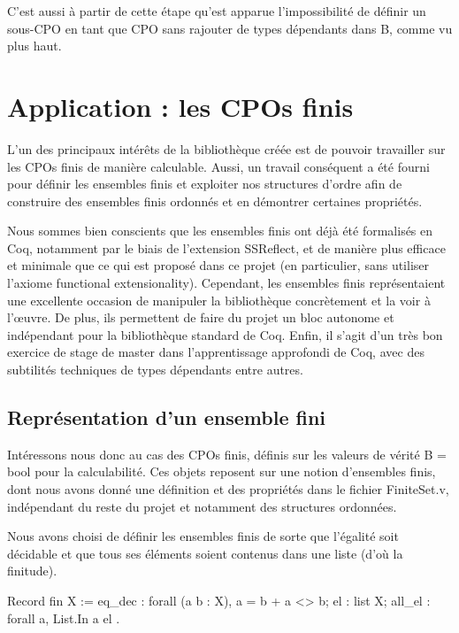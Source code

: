 \documentclass{article}
\newcommand\code[1]{{\fontfamily{lmtt}\selectfont #1}}
\theoremstyle{definition}
\begin{document}
C'est aussi à partir de cette étape qu'est apparue l'impossibilité de définir un sous-CPO en tant que CPO sans rajouter de types dépendants dans \code{B}, comme vu plus haut.



\section{Application :  les CPOs finis}

L'un des principaux intérêts de la bibliothèque créée est de pouvoir travailler sur les CPOs finis de manière calculable. Aussi, un travail conséquent a été fourni pour définir les ensembles finis et exploiter nos structures d'ordre afin de construire des ensembles finis ordonnés et en démontrer certaines propriétés.

Nous sommes bien conscients que les ensembles finis ont déjà été formalisés en Coq, notamment par le biais de l'extension SSReflect, et de manière plus efficace et minimale que ce qui est proposé dans ce projet (en particulier, sans utiliser l'axiome \code{functional extensionality}). Cependant, les ensembles finis représentaient une excellente occasion de manipuler la bibliothèque concrètement et la voir à l’œuvre. De plus, ils permettent de faire du projet un bloc autonome et indépendant pour la bibliothèque standard de Coq. Enfin, il s'agit d'un très bon exercice de stage de master dans l'apprentissage approfondi de Coq, avec des subtilités techniques de types dépendants entre autres.


\subsection{Représentation d'un ensemble fini}
\label{finis}

Intéressons nous donc au cas des CPOs finis, définis sur les valeurs de vérité \code{B = bool} pour la calculabilité. Ces objets reposent sur une notion d'ensembles finis, dont nous avons donné une définition et des propriétés dans le fichier \code{FiniteSet.v}, indépendant du reste du projet et notamment des structures ordonnées.

Nous avons choisi de définir les ensembles finis de sorte que l'égalité soit décidable et que tous ses éléments soient contenus dans une liste (d'où la finitude).

\begin{coq}
Record fin X := {
  eq_dec : forall (a b : X), {a = b} + {a <> b};
  el : list X;
  all_el : forall a, List.In a el
  }.
\end{coq}
\end{document}
